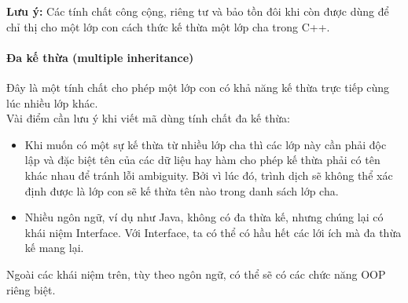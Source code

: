 \documentclass[10pt, a4paper]{article}
\begin{document}
{\bf Lưu ý: } Các tính chất công cộng, riêng tư và bảo tồn đôi khi còn được dùng để chỉ thị cho một lớp con cách thức kế thừa một lớp cha trong C++.

\paragraph{Đa kế thừa (multiple inheritance)}

Đây là một tính chất cho phép một lớp con có khả năng kế thừa trực tiếp cùng lúc nhiều lớp khác.\\

Vài điểm cần lưu ý khi viết mã dùng tính chất đa kế thừa:
\begin{itemize}
\item Khi muốn có một sự kế thừa từ nhiều lớp cha thì các lớp này cần phải độc lập và đặc biệt tên của các dữ liệu hay hàm cho phép kế thừa phải có tên khác nhau để tránh lỗi \textsf{ambiguity}. Bởi vì lúc đó, trình dịch sẽ không thể xác định được là lớp con sẽ kế thừa tên nào trong danh sách lớp cha.
\item Nhiều ngôn ngữ, ví dụ như Java, không có đa thừa kế, nhưng chúng lại có khái niệm Interface. Với Interface, ta có thể có hầu hết các lới ích mà đa thừa kế mang lại.
\end{itemize}

Ngoài các khái niệm trên, tùy theo ngôn ngữ, có thể sẽ có các chức năng OOP riêng biệt.
\end{document}
